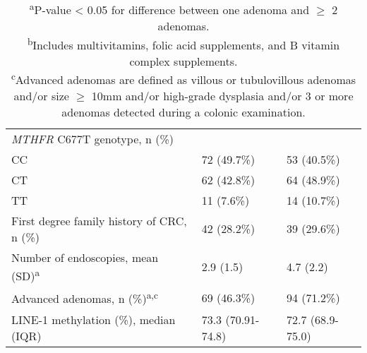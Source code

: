 \begin{table}
\begin{adjustbox}{width=\textwidth}
\begin{tabular}{L{6.4cm}C{3cm}C{3cm}}
{\textit{MTHFR}}{ C677T genotype, n (\%)}\\
\quad CC & 72 (49.7\%) & 53 (40.5\%)\\
\quad CT & 62 (42.8\%) & 64 (48.9\%)\\
\quad TT & 11 (7.6\%) & 14 (10.7\%)\\
First degree family history of CRC, n (\%) & 42 (28.2\%) & 39 (29.6\%)\\
Number of endoscopies, mean (SD)\textsuperscript{a} & 2.9 (1.5) & 4.7 (2.2)\\
Advanced adenomas, n (\%)\textsuperscript{a,c} & 69 (46.3\%) & 94 (71.2\%)\\
LINE-1 methylation (\%), median (IQR) & 73.3 (70.91-74.8) & 72.7 (68.9-75.0)\\
\hline
\end{tabular}
\end{adjustbox}
\caption*{\footnotesize{\textsuperscript{a}P-value < 0.05 for difference between one adenoma and $\geq$ 2 adenomas. \\ \textsuperscript{b}Includes multivitamins, folic acid supplements, and B vitamin complex supplements. \\ \textsuperscript{c}Advanced adenomas are defined as villous or tubulovillous adenomas and/or size $\geq$ 10mm and/or high-grade dysplasia and/or 3 or more adenomas detected during a colonic examination.}}
\end{table}


